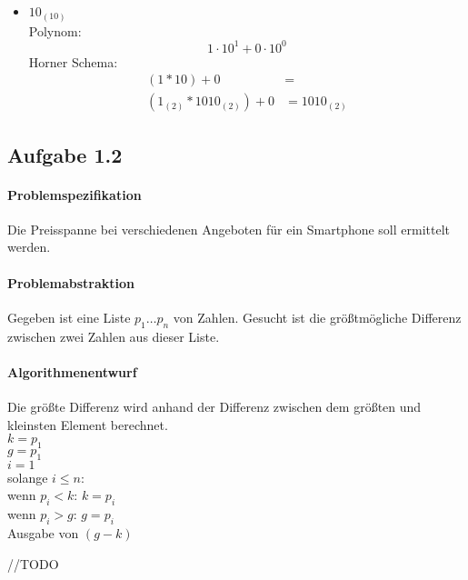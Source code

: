 \documentclass{article}
\begin{document}
\begin{itemize}
\begin{equation}
          \end{equation}
        \item $10_{(10)}$\\
        Polynom:
        \begin{equation}
          1 \cdot 10^1 + 0 \cdot10^0
        \end{equation}
        Horner Schema:
          \begin{equation}
            \begin{aligned}
              (1 * 10) + 0 &=\\
              (1_{(2)} * 1010_{(2)}) + 0 &= 1010_{(2)}
            \end{aligned}
          \end{equation}
      \end{itemize}
    \subsection{Aufgabe 1.2}
      \paragraph{Problemspezifikation} Die Preisspanne bei verschiedenen Angeboten
      für ein Smartphone soll ermittelt werden.
      \paragraph{Problemabstraktion} Gegeben ist eine Liste $p_1 \ldots p_n$ von Zahlen. Gesucht
      ist die größtmögliche Differenz zwischen zwei Zahlen aus dieser Liste.
      \paragraph{Algorithmenentwurf} Die größte Differenz wird anhand der
      Differenz zwischen dem größten und kleinsten Element berechnet.\\

      $k = p_1$\\
      $g = p_1$\\
      $i = 1$\\
      solange $i \leq n$:\\
        \- wenn $p_i < k$: $k = p_i$\\
        \- wenn $p_i > g$: $g = p_i$\\
      Ausgabe von $(g - k)$


//TODO
\end{document}
